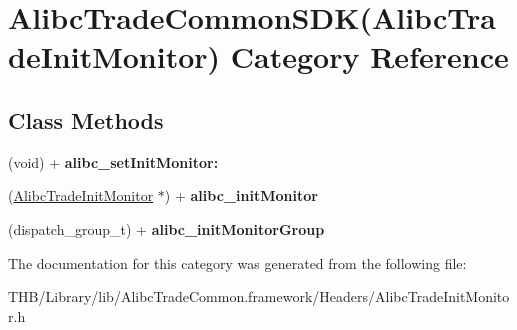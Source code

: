 \hypertarget{category_alibc_trade_common_s_d_k_07_alibc_trade_init_monitor_08}{}\section{Alibc\+Trade\+Common\+S\+DK(Alibc\+Trade\+Init\+Monitor) Category Reference}
\label{category_alibc_trade_common_s_d_k_07_alibc_trade_init_monitor_08}
\subsection*{Class Methods}
\begin{DoxyCompactItemize}
\item 
\mbox{\label{category_alibc_trade_common_s_d_k_07_alibc_trade_init_monitor_08_ad261c6a52caad477278b230c6fd5fe71}} 
(void) + {\bfseries alibc\+\_\+set\+Init\+Monitor\+:}
\item 
\mbox{\label{category_alibc_trade_common_s_d_k_07_alibc_trade_init_monitor_08_a53ab025047db524937701ea60c1f39a3}} 
(\mbox{\hyperlink{interface_alibc_trade_init_monitor}{Alibc\+Trade\+Init\+Monitor}} $\ast$) + {\bfseries alibc\+\_\+init\+Monitor}
\item 
\mbox{\label{category_alibc_trade_common_s_d_k_07_alibc_trade_init_monitor_08_a9dd9bc766af9caccf81ad5edc27e6112}} 
(dispatch\+\_\+group\+\_\+t) + {\bfseries alibc\+\_\+init\+Monitor\+Group}
\end{DoxyCompactItemize}


The documentation for this category was generated from the following file\+:\begin{DoxyCompactItemize}
\item 
T\+H\+B/\+Library/lib/\+Alibc\+Trade\+Common.\+framework/\+Headers/Alibc\+Trade\+Init\+Monitor.\+h\end{DoxyCompactItemize}
